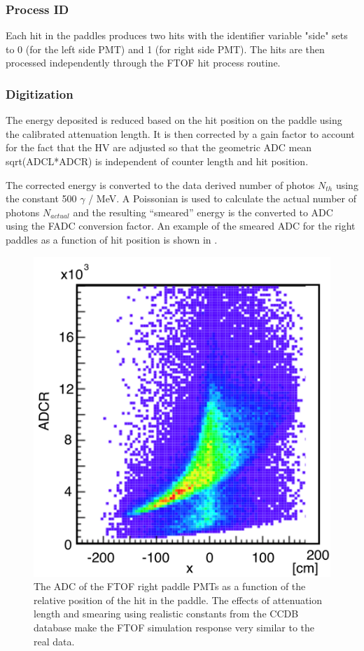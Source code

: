 \subsubsection{Process ID}

Each hit in the paddles produces two hits with the identifier variable "side" sets to 0 (for the left side PMT) and 1 (for right side PMT).
The hits are then processed independently through the FTOF hit process routine.

\subsubsection{Digitization}

The energy deposited is reduced based on the hit position on the paddle using the calibrated attenuation length. It is then corrected by a gain factor
to account for the fact that the HV are adjusted so that the geometric ADC mean sqrt(ADCL*ADCR) is independent of counter length and hit position.

The corrected energy is converted to the data derived number of photos $N_{th}$ using the constant 500 $\gamma$ / MeV. A Poissonian is used to
calculate the actual number of photons $N_{actual}$ and the resulting ``smeared'' energy is the converted to ADC using the FADC conversion factor.
An example of the smeared ADC for the right paddles as a function of hit position is shown in .

\begin{figure}
	\centering
	\includegraphics[width=0.99\columnwidth,keepaspectratio]{img/ftofAtten.png}
	\caption{The ADC of the FTOF right paddle PMTs as a function of the relative position of the hit in the paddle. The effects of attenuation
				length and smearing using realistic constants from the CCDB database make the FTOF simulation response very similar to the real data.}
	\label{fig:ftofAtten}
\end{figure}

